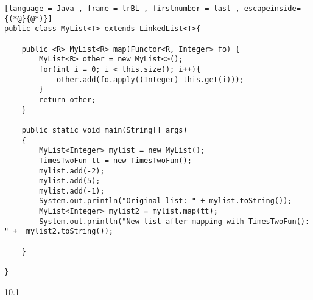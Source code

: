 \begin{enumerate}[label=(\alph*),align=left, wide, labelwidth=!, labelindent=0pt]
\begin{lstlisting}[language = Java , frame = trBL , firstnumber = last , escapeinside={(*@}{@*)}]
public class MyList<T> extends LinkedList<T>{
    
    public <R> MyList<R> map(Functor<R, Integer> fo) {
        MyList<R> other = new MyList<>();
        for(int i = 0; i < this.size(); i++){
            other.add(fo.apply((Integer) this.get(i)));
        }
        return other;
    }
    
    public static void main(String[] args)
    {
        MyList<Integer> mylist = new MyList();
        TimesTwoFun tt = new TimesTwoFun();
        mylist.add(-2);
        mylist.add(5);
        mylist.add(-1);
        System.out.println("Original list: " + mylist.toString());
        MyList<Integer> mylist2 = mylist.map(tt);
        System.out.println("New list after mapping with TimesTwoFun(): " +  mylist2.toString());
    
    }

}
\end{lstlisting}  		

\end{enumerate}
 
10.1

\noindent


